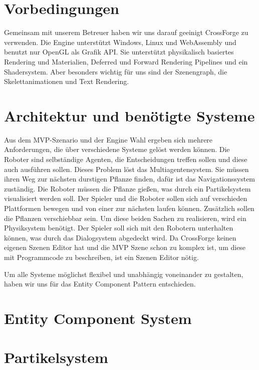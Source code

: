 
\section{Vorbedingungen}

Gemeinsam mit unserem Betreuer haben wir uns darauf geeinigt CrossForge zu verwenden. Die Engine unterstützt Windows, Linux und WebAssembly und benutzt nur OpenGL als Grafik API. Sie unterstützt physikalisch basiertes Rendering und Materialien, Deferred und Forward Rendering Pipelines und ein Shadersystem. Aber besonders wichtig für uns sind der Szenengraph, die Skelettanimationen und Text Rendering.

\section{Architektur und benötigte Systeme}

Aus dem MVP-Szenario und der Engine Wahl ergeben sich mehrere Anforderungen, die über verschiedene Systeme gelöst werden können. Die Roboter sind selbständige Agenten, die Entscheidungen treffen sollen und diese auch ausführen sollen. Dieses Problem löst das Multiagentensystem. Sie müssen ihren Weg zur nächsten durstigen Pflanze finden, dafür ist das Navigationssystem zuständig. Die Roboter müssen die Pflanze gießen, was durch ein Partikelsystem visualisiert werden soll. Der Spieler und die Roboter sollen sich auf verschieden Plattformen bewegen und von einer zur nächsten laufen können. Zusätzlich sollen die Pflanzen verschiebbar sein. Um diese beiden Sachen zu realisieren, wird ein Physiksystem benötigt.
Der Spieler soll sich mit den Robotern unterhalten können, was durch das Dialogsystem abgedeckt wird.
Da CrossForge keinen eigenen Szenen Editor hat und die MVP Szene schon zu komplex ist, um diese mit Programmcode zu beschreiben, ist ein Szenen Editor nötig.

Um alle Systeme möglichst flexibel und unabhängig voneinander zu gestalten, haben wir uns für das Entity Component Pattern entschieden.

\section{Entity Component System}

\section{Partikelsystem}


